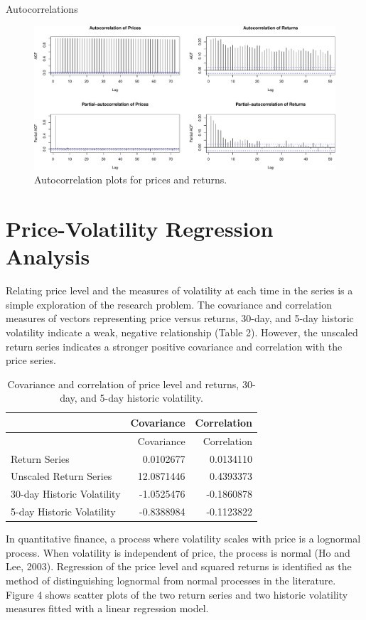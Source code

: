\documentclass[]{article}
\begin{document}
Autocorrelations

\begin{figure}[htbp]
\centering
\includegraphics{Figs/unnamed-chunk-6-1.pdf}
\caption{Autocorrelation plots for prices and returns.}
\end{figure}

\section{Price-Volatility Regression
Analysis}\label{price-volatility-regression-analysis}

Relating price level and the measures of volatility at each time in the
series is a simple exploration of the research problem. The covariance
and correlation measures of vectors representing price versus returns,
30-day, and 5-day historic volatility indicate a weak, negative
relationship (Table 2). However, the unscaled return series indicates a
stronger positive covariance and correlation with the price series.

\begin{longtable}[]{@{}lrr@{}}
\caption{Covariance and correlation of price level and returns, 30-day,
and 5-day historic volatility.}\tabularnewline
\toprule
& Covariance & Correlation\tabularnewline
\midrule
\endfirsthead
\toprule
& Covariance & Correlation\tabularnewline
\midrule
\endhead
Return Series & 0.0102677 & 0.0134110\tabularnewline
Unscaled Return Series & 12.0871446 & 0.4393373\tabularnewline
30-day Historic Volatility & -1.0525476 & -0.1860878\tabularnewline
5-day Historic Volatility & -0.8388984 & -0.1123822\tabularnewline
\bottomrule
\end{longtable}

In quantitative finance, a process where volatility scales with price is
a lognormal process. When volatility is independent of price, the
process is normal (Ho and Lee, 2003). Regression of the price level and
squared returns is identified as the method of distinguishing lognormal
from normal processes in the literature. Figure 4 shows scatter plots of
the two return series and two historic volatility measures fitted with a
linear regression model.
\end{document}
